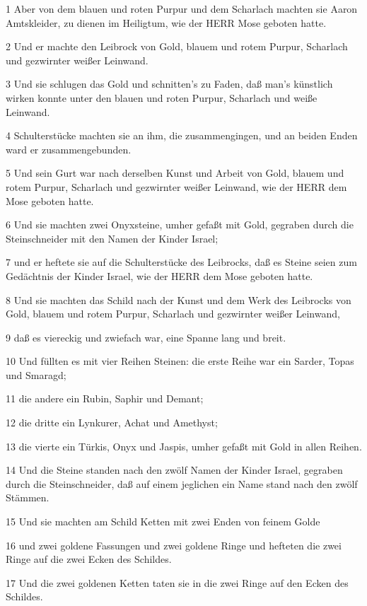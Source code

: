 \par 1 Aber von dem blauen und roten Purpur und dem Scharlach machten sie Aaron Amtskleider, zu dienen im Heiligtum, wie der HERR Mose geboten hatte.
\par 2 Und er machte den Leibrock von Gold, blauem und rotem Purpur, Scharlach und gezwirnter weißer Leinwand.
\par 3 Und sie schlugen das Gold und schnitten's zu Faden, daß man's künstlich wirken konnte unter den blauen und roten Purpur, Scharlach und weiße Leinwand.
\par 4 Schulterstücke machten sie an ihm, die zusammengingen, und an beiden Enden ward er zusammengebunden.
\par 5 Und sein Gurt war nach derselben Kunst und Arbeit von Gold, blauem und rotem Purpur, Scharlach und gezwirnter weißer Leinwand, wie der HERR dem Mose geboten hatte.
\par 6 Und sie machten zwei Onyxsteine, umher gefaßt mit Gold, gegraben durch die Steinschneider mit den Namen der Kinder Israel;
\par 7 und er heftete sie auf die Schulterstücke des Leibrocks, daß es Steine seien zum Gedächtnis der Kinder Israel, wie der HERR dem Mose geboten hatte.
\par 8 Und sie machten das Schild nach der Kunst und dem Werk des Leibrocks von Gold, blauem und rotem Purpur, Scharlach und gezwirnter weißer Leinwand,
\par 9 daß es viereckig und zwiefach war, eine Spanne lang und breit.
\par 10 Und füllten es mit vier Reihen Steinen: die erste Reihe war ein Sarder, Topas und Smaragd;
\par 11 die andere ein Rubin, Saphir und Demant;
\par 12 die dritte ein Lynkurer, Achat und Amethyst;
\par 13 die vierte ein Türkis, Onyx und Jaspis, umher gefaßt mit Gold in allen Reihen.
\par 14 Und die Steine standen nach den zwölf Namen der Kinder Israel, gegraben durch die Steinschneider, daß auf einem jeglichen ein Name stand nach den zwölf Stämmen.
\par 15 Und sie machten am Schild Ketten mit zwei Enden von feinem Golde
\par 16 und zwei goldene Fassungen und zwei goldene Ringe und hefteten die zwei Ringe auf die zwei Ecken des Schildes.
\par 17 Und die zwei goldenen Ketten taten sie in die zwei Ringe auf den Ecken des Schildes.
